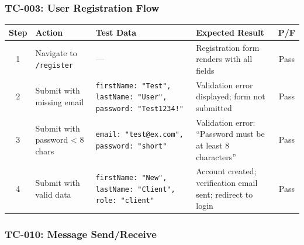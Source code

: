\documentclass[12pt,letterpaper]{article}
\begin{document}
\subsubsection*{TC-003: User Registration Flow}

\begin{table}[H]
\centering
\small
\begin{tabularx}{\textwidth}{|c|>{\raggedright\arraybackslash}X|>{\raggedright\arraybackslash}p{3cm}|>{\raggedright\arraybackslash}X|c|}
\hline
\rowcolor{TableHeader}\textcolor{TableHeaderText}{\textbf{Step}} & \textcolor{TableHeaderText}{\textbf{Action}} & \textcolor{TableHeaderText}{\textbf{Test Data}} & \textcolor{TableHeaderText}{\textbf{Expected Result}} & \textcolor{TableHeaderText}{\textbf{P/F}} \\
\hline
1 & Navigate to \texttt{/register} & --- & Registration form renders with all fields & Pass \\
\hline
\rowcolor{TableRowAlt}
2 & Submit with missing email & \texttt{firstName: "Test", lastName: "User", password: "Test1234!"} & Validation error displayed; form not submitted & Pass \\
\hline
3 & Submit with password < 8 chars & \texttt{email: "test@ex.com", password: "short"} & Validation error: ``Password must be at least 8 characters'' & Pass \\
\hline
\rowcolor{TableRowAlt}
4 & Submit with valid data & \texttt{firstName: "New", lastName: "Client", role: "client"} & Account created; verification email sent; redirect to login & Pass \\
\hline
\end{tabularx}
\end{table}

\subsubsection*{TC-010: Message Send/Receive}
\end{document}
